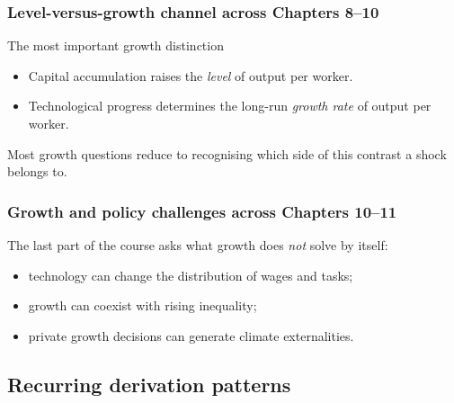 \documentclass[12pt]{article}
\begin{document}
\subsubsection*{Level-versus-growth channel across Chapters 8--10}

\begin{theorem}{The most important growth distinction}{}
\begin{itemize}[leftmargin=1.5em]
\item Capital accumulation raises the \emph{level} of output per worker.
\item Technological progress determines the long-run \emph{growth rate} of output per worker.
\end{itemize}
Most growth questions reduce to recognising which side of this contrast a shock belongs to.
\end{theorem}

\subsubsection*{Growth and policy challenges across Chapters 10--11}

The last part of the course asks what growth does \emph{not} solve by itself:
\begin{itemize}[leftmargin=1.5em]
\item technology can change the distribution of wages and tasks;
\item growth can coexist with rising inequality;
\item private growth decisions can generate climate externalities.
\end{itemize}

\subsection{Recurring derivation patterns}
\end{document}
